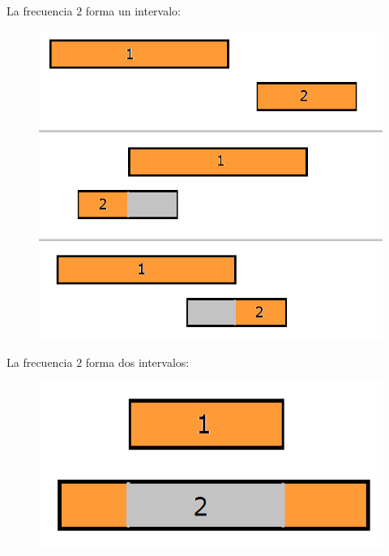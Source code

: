 La frecuencia $2$ forma un intervalo:

 \begin{figure}[h!]
   \begin{center}
 	\includegraphics[scale=0.45]{imagenes/ej2/secuencias/Paso1/Caso1.png}
   \end{center}
 \end{figure}
 

 \newpage
La frecuencia $2$ forma dos intervalos: 
 
  \begin{figure}[h!]
   \begin{center}
 	\includegraphics[scale=0.45]{imagenes/ej2/secuencias/Paso1/Caso2.png}
   \end{center}
 \end{figure}
 


